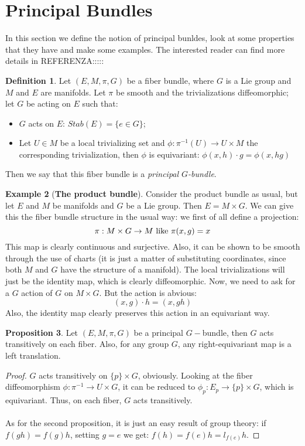 \documentclass[12pt,a4paper]{report}
\theoremstyle{definition}
\newtheorem{Def}{Definition}[chapter]
\theoremstyle{Theorem}
\newtheorem{Prop}[Def]{Proposition}
\theoremstyle{definition}
\newtheorem{Ex}[Def]{Example}
\theoremstyle{definition}
\begin{document}
		\section{Principal Bundles}
		In this section we define the notion of principal bunldes, look at some properties that they have and make some examples. The interested reader can find more details in REFERENZA:::::
		\begin{Def}
			Let $(E,M,\pi,G)$ be a fiber bundle, where $G$ is a Lie group and $M$ and $E$ are manifolds. Let $\pi$ be smooth and the trivializations diffeomorphic; let $G$ be acting on $E$ such that:
			\begin{itemize}
				\item $G$ acts on $E$: $Stab(E)=\{e\in G\}$;
				\item Let $U\in M$ be a local trivializing set and $\phi:\pi^{-1}(U)\rightarrow U\times M$  the corresponding trivialization, then $\phi$ is equivariant: $\phi(x,h)\cdot g=\phi(x,hg)$
			\end{itemize} 
			Then we say that this fiber bundle is a \textit{principal $G$-bundle}.
		\end{Def}
		\begin{Ex}[\textbf{The product bundle}]
			Consider the product bundle as usual, but let $E$ and $M$ be manifolds and $G$ be a Lie group. Then $E=M\times G$. We can give this the fiber bundle structure in the usual way: we first of all define a projection:
			$$\pi:M\times G\rightarrow M\hbox{ like }\pi(x,g)=x$$
			This map is clearly continuous and surjective. Also, it can be shown to be smooth through the use of charts (it is just a matter of substituting coordinates, since both $M$ and $G$ have the structure of a manifold). The local trivializations will just be the identity map, which is clearly diffeomorphic. Now, we need to ask for a $G$ action of $G$ on $M\times G$. But the action is abvious:
			$$(x,g)\cdot h=(x,gh)$$
			Also, the identity map clearly preserves this action in an equivariant way.
		\end{Ex}
		\begin{Prop}
			Let $(E,M,\pi,G)$ be a principal $G-$bundle, then $G$ acts transitively on each fiber. Also, for any group $G$, any right-equivariant map is a left translation.
		\end{Prop}
		\begin{proof}
			$G$ acts transitively on $\{p\} \times G$, obviously. Looking at the fiber diffeomorphism $\phi:\pi^{-1}\rightarrow U\times G$, it can be reduced to $\phi_p:E_p\rightarrow \{p\}\times G$, which is equivariant. Thus, on each fiber, $G$ acts transitively.\\
			\\
			As for the second proposition, it is just an easy result of group theory: if $f(gh)=f(g)h$, setting $g=e$ we get: $f(h)=f(e)h=l_{f(e)}h$.
		\end{proof}
\end{document}
